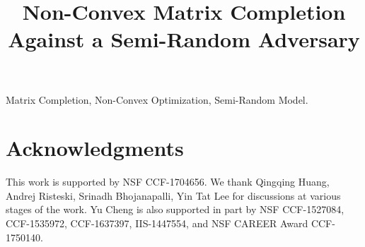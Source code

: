 \documentclass[final,12pt]{colt2018} %
\title[Non-Convex Matrix Completion Against a Semi-Random Adversary]{Non-Convex Matrix Completion Against a Semi-Random Adversary}
\begin{document}

\maketitle




\begin{keywords}
Matrix Completion, Non-Convex Optimization, Semi-Random Model.
\end{keywords}













\section*{Acknowledgments} This work is supported by NSF CCF-1704656. We thank Qingqing Huang, Andrej Risteski, Srinadh Bhojanapalli, Yin Tat Lee for discussions at various stages of the work. Yu Cheng is also supported in part by NSF CCF-1527084, CCF-1535972, CCF-1637397, IIS-1447554, and NSF CAREER Award CCF-1750140.

%


\appendix






\end{document}
